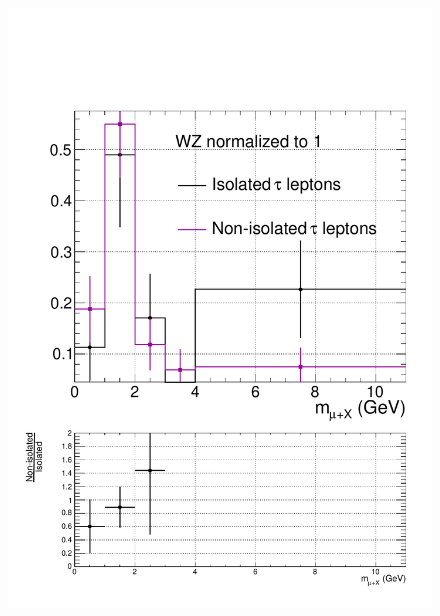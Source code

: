 \begin{figure}[hbtp]
\begin{center}
    \includegraphics[width=0.6\cmsFigWidth]{figures/isoVsNonIsoTaus_WZ_highMT_v87}

\end{center}
\end{figure}

